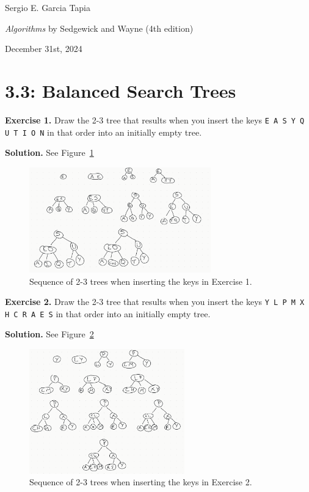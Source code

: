 \documentclass[12pt, a4paper]{article}
\newenvironment{ex}[2][Exercise]
{\par\medskip\noindent \textbf{#1 #2.}}
{\medskip}
\newenvironment{sol}[1][Solution]
{\par\medskip\noindent \textbf{#1.} }
{\medskip}
\begin{document}
	\noindent Sergio E. Garcia Tapia \hfill
	
	\noindent \emph{Algorithms} by Sedgewick and Wayne (4th edition) \cite{sedgewick_wayne}\hfill
	
	\noindent December 31st, 2024\hfill 
	\section*{3.3: Balanced Search Trees}
	\begin{ex}{1}
		Draw the 2-3 tree that results when you insert the keys \texttt{E A S Y Q U T I O N}
		in that order into an initially empty tree.
	\end{ex}
	\begin{sol}
		See Figure~\ref{fig:ex-01}
		\begin{figure}
			\centering
			\includegraphics[width=0.7\textwidth]{exercise-01}
			\caption{Sequence of 2-3 trees when inserting the keys in Exercise 1.}
			\label{fig:ex-01}
		\end{figure}
	\end{sol}
	\begin{ex}{2}
		Draw the 2-3 tree that results when you insert the keys
		\texttt{Y L P M X H C R A E S} in that order into an initially empty tree.
	\end{ex}
	\begin{sol}
		See Figure~\ref{fig:ex-02}
		\begin{figure}
			\centering
			\includegraphics[width=0.6\textwidth]{exercise-02}
			\caption{Sequence of 2-3 trees when inserting the keys in Exercise 2.}
			\label{fig:ex-02}
		\end{figure}
	\end{sol}
\end{document}
